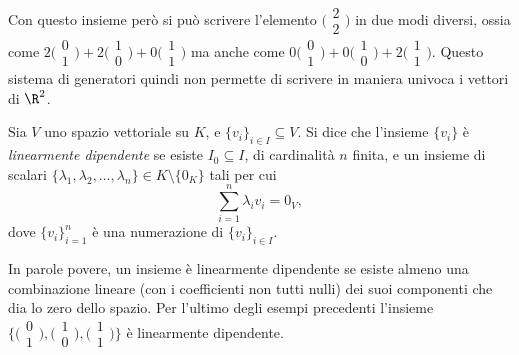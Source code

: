 \begin{itemize}
		Con questo insieme però si può scrivere l'elemento $\big(\begin{smallmatrix} 2\\2 \end{smallmatrix}\big)$ in due modi diversi, ossia come $2\big(\begin{smallmatrix} 0\\1 \end{smallmatrix}\big)+2\big(\begin{smallmatrix} 1\\0 \end{smallmatrix}\big)+0\big(\begin{smallmatrix} 1\\1 \end{smallmatrix}\big)$ ma anche come $0\big(\begin{smallmatrix} 0\\1 \end{smallmatrix}\big)+0\big(\begin{smallmatrix} 1\\0 \end{smallmatrix}\big)+2\big(\begin{smallmatrix} 1\\1 \end{smallmatrix}\big)$.
		Questo sistema di generatori quindi non permette di scrivere in maniera univoca i vettori di $\R^2$.
\end{itemize}

\begin{definizione} \label{d:dipendenza-lineare}
	Sia $V$ uno spazio vettoriale su $K$, e $\{  v_i\}_{i\in I}\subseteq V$.
	Si dice che l'insieme $\{v_i\}$ è \emph{linearmente dipendente} se esiste $I_0\subseteq I$, di cardinalità $n$ finita, e un insieme di scalari $\{\lambda_1,\lambda_2,\dots,\lambda_n\}\in K\setminus\{0_K\}$ tali per cui
	\begin{equation*}
		\sum_{i=1}^n\lambda_i  v_i=0_V,
	\end{equation*}
	dove $\{  v_i\}_{i=1}^n$ è una numerazione di $\{  v_i\}_{i\in I}$.
\end{definizione}
In parole povere, un insieme è linearmente dipendente se esiste almeno una combinazione lineare (con i coefficienti non tutti nulli) dei suoi componenti che dia lo zero dello spazio.
Per l'ultimo degli esempi precedenti l'insieme $\big\{\big(\begin{smallmatrix} 0\\1 \end{smallmatrix}\big),\big(\begin{smallmatrix} 1\\0 \end{smallmatrix}\big),\big(\begin{smallmatrix} 1\\1 \end{smallmatrix}\big)\big\}$ è linearmente dipendente.

